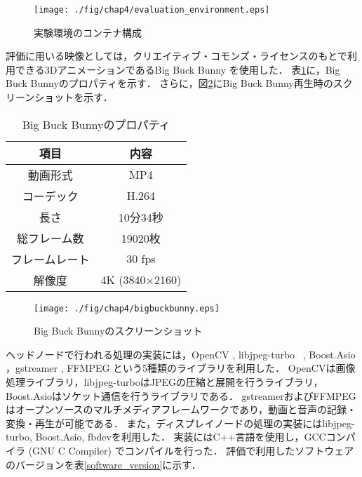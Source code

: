 \begin{figure}[H]
    \hspace*{\fill}
    \texttt{[image: ./fig/chap4/evaluation\_environment.eps]}
    \hspace*{\fill}
    \caption{実験環境のコンテナ構成}
    \label{evaluation_environment}
\end{figure}

評価に用いる映像としては，クリエイティブ・コモンズ・ライセンスのもとで利用できる3DアニメーションであるBig Buck Bunny \cite{bigbackbunny}を使用した．
表\ref{bigbuckbunny}に，Big Buck Bunnyのプロパティを示す．
さらに，図\ref{bbb_screenshot}にBig Buck Bunny再生時のスクリーンショットを示す．

\begin{table}[H]
    \caption{Big Buck Bunnyのプロパティ}
    \begin{center}
    \begin{tabular}{cc}
    \hline
    項目 & 内容 \\\hline\hline
    動画形式　& MP4 \\ \hline
    コーデック & H.264 \cite{h264} \\ \hline
    長さ & 10分34秒 \\ \hline
    総フレーム数 & 19020枚 \\ \hline
    フレームレート & 30 fps \\ \hline
    解像度 & 4K (3840×2160) \\ \hline
    \end{tabular}
    \label{bigbuckbunny}
    \end{center}
\end{table}

\begin{figure}[H]
    \hspace*{\fill}
    \texttt{[image: ./fig/chap4/bigbuckbunny.eps]}
    \hspace*{\fill}
    \caption{Big Buck Bunnyのスクリーンショット}
    \label{bbb_screenshot}
   \end{figure}

ヘッドノードで行われる処理の実装には，OpenCV \cite{opencv}, libjpeg-turbo ~\cite{libjpeg}, Boost.Asio \cite{asio}，gstreamer \cite{gstreamer} , FFMPEG \cite{ffmpeg}という5種類のライブラリを利用した． 
OpenCVは画像処理ライブラリ，libjpeg-turboはJPEGの圧縮と展開を行うライブラリ，Boost.Asioはソケット通信を行うライブラリである．
gstreamerおよびFFMPEGはオープンソースのマルチメディアフレームワークであり，動画と音声の記録・変換・再生が可能である．
また，ディスプレイノードの処理の実装にはlibjpeg-turbo, Boost.Asio, fbdevを利用した．
実装にはC++言語を使用し，GCCコンパイラ (GNU C Compiler) \cite{gcc}でコンパイルを行った．
評価で利用したソフトウェアのバージョンを表\ref{software_version}に示す．

